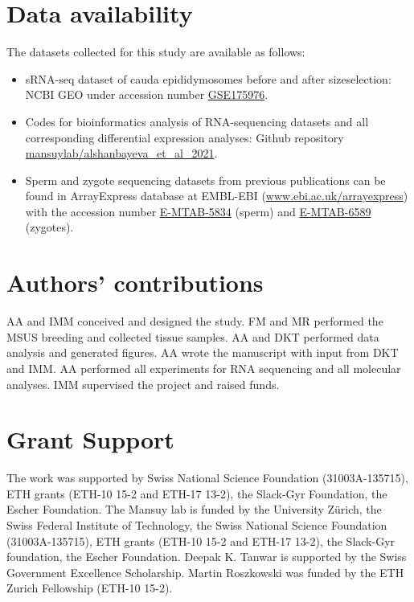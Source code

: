\documentclass[12pt,twoside]{reedthesis}
\begin{document}
\hypertarget{data-availability}{%
\section{Data availability}\label{data-availability}}

The datasets collected for this study are available as follows:
\begin{itemize}
\item
  sRNA-seq dataset of cauda epididymosomes before and after
  sizeselection: NCBI GEO under accession number
  \href{https://www.ncbi.nlm.nih.gov/geo/query/acc.cgi?acc=GSE175976}{GSE175976}.
\item
  Codes for bioinformatics analysis of RNA-sequencing datasets and all
  corresponding differential expression analyses: Github repository
  \href{https://github.com/mansuylab/alshanbayeva_et_al_2021}{mansuylab/alshanbayeva\_et\_al\_2021}.
\item
  Sperm and zygote sequencing datasets from previous publications can
  be found in ArrayExpress database at EMBL-EBI
  (\url{www.ebi.ac.uk/arrayexpress}) with the
  accession number
  \href{https://www.ebi.ac.uk/arrayexpress/experiments/E-MTAB-5834/}{E-MTAB-5834}
  (sperm) and
  \href{https://www.ebi.ac.uk/arrayexpress/experiments/E-MTAB-6589/}{E-MTAB-6589}
  (zygotes).
\end{itemize}
\hypertarget{authors-contributions}{%
\section{Authors' contributions}\label{authors-contributions}}

AA and IMM conceived and designed the study. FM and MR performed the
MSUS breeding and collected tissue samples. AA and DKT performed data
analysis and generated figures. AA wrote the manuscript with input from
DKT and IMM. AA performed all experiments for RNA sequencing and all
molecular analyses. IMM supervised the project and raised funds.

\hypertarget{grant-support}{%
\section{Grant Support}\label{grant-support}}

The work was supported by Swiss National Science Foundation
(31003A-135715), ETH grants (ETH-10 15-2 and ETH-17 13-2), the Slack-Gyr
Foundation, the Escher Foundation. The Mansuy lab is funded by the
University Zürich, the Swiss Federal Institute of Technology, the Swiss
National Science Foundation (31003A-135715), ETH grants (ETH-10 15-2 and
ETH-17 13-2), the Slack-Gyr foundation, the Escher Foundation. Deepak K.
Tanwar is supported by the Swiss Government Excellence Scholarship.
Martin Roszkowski was funded by the ETH Zurich Fellowship (ETH-10 15-2).
\end{document}
